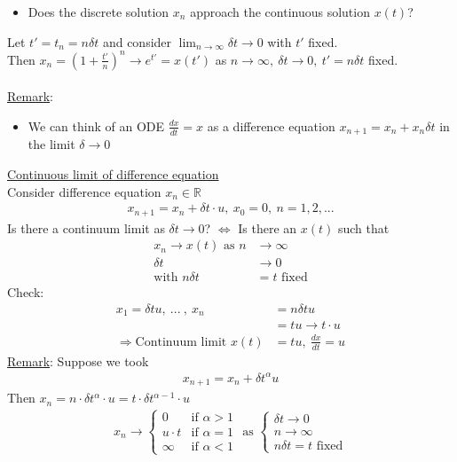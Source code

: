 \documentclass[12pt, letterpaper]{article}
\begin{document}
\begin{itemize}
    \item Does the discrete solution $x_n$ approach the continuous solution $x(t)$?
\end{itemize}
Let $t' = t_n = n\delta t$ and consider $\lim_{n\rightarrow \infty} \delta t \rightarrow 0 $ with $t'$ fixed. \\
Then $x_n = (1 + \frac{t'}{n})^n \rightarrow e^{t'} = x(t')$ as $n\rightarrow \infty,\ \delta t \rightarrow 0,\ t' = n\delta t$ fixed. \\ \\
\underline{Remark}:
\begin{itemize}
    \item We can think of an ODE $\frac{dx}{dt} = x$ as a difference equation 
    $x_{n+1} = x_n + x_n \delta t$ in the limit $\delta \rightarrow 0$
\end{itemize}
\underline{Continuous limit of difference equation} \\
Consider difference equation $x_n \in \mathbb{R}$ 
\begin{align*}
    x_{n+1} = x_n + \delta t \cdot u,\ x_0 = 0,\ n = 1,2,...
\end{align*}
Is there a continuum limit as $\delta t \rightarrow 0$? $\Leftrightarrow$ Is there an $x(t)$ such that
\begin{align*}
    x_n \rightarrow x(t) \text{ as } n &\rightarrow \infty \\
    \delta t &\rightarrow 0 \\
    \text{with } n\delta t &= t \text{ fixed}
\end{align*}
Check:
\begin{align*}
    x_1 = \delta t u,\ ...\ ,\ x_n &= n \delta t u \\  
    &= tu \rightarrow t\cdot u \\
    \Rightarrow \text{Continuum limit } x(t) &= tu,\ \frac{dx}{dt} = u
\end{align*}
\underline{Remark}:
Suppose we took
\begin{align*}
    x_{n+1} = x_n + \delta t^\alpha u 
\end{align*}
Then $x_n = n \cdot \delta t^\alpha \cdot u = t \cdot \delta t^{\alpha -1}\cdot u$ 
\begin{align*}
    x_n \rightarrow \begin{cases}
        0 & \text{if } \alpha > 1 \\
        u\cdot t & \text{if } \alpha = 1 \\
        \infty & \text{if } \alpha < 1
    \end{cases} \text{ as } 
    \begin{cases}
        \delta  t \rightarrow 0 \\
        n \rightarrow \infty \\
        n \delta t = t \text{ fixed}
    \end{cases}
\end{align*}
\end{document}
